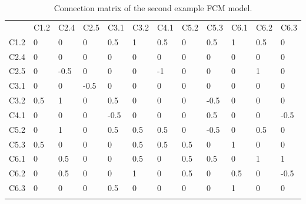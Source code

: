 \documentclass[graybox]{svmult}
\begin{document}
\begin{table}
\caption{Connection matrix of the second example FCM model.}
\label{tab:BP2Spartial-connectionMtx}
\begin{center}
\begin{tabular}{l|lllllllllll}
\hline\noalign{\smallskip}
 & C1.2 & C2.4 & C2.5 & C3.1 & C3.2 & C4.1 & C5.2 & C5.3 & C6.1 & C6.2 & C6.3\\
\noalign{\smallskip}\hline\noalign{\smallskip}
C1.2 & 0 & 0 & 0 & 0.5 & 1 & 0.5 & 0 & 0.5 & 1 & 0.5 & 0\\
C2.4 & 0 & 0 & 0 & 0 & 0 & 0 & 0 & 0 & 0 & 0 & 0\\
C2.5 & 0 & -0.5 & 0 & 0 & 0 & -1 & 0 & 0 & 0 & 1 & 0\\
C3.1 & 0 & 0 & -0.5 & 0 & 0 & 0 & 0 & 0 & 0 & 0 & 0\\
C3.2 & 0.5 & 1 & 0 & 0.5 & 0 & 0 & 0 & -0.5 & 0 & 0 & 0\\
C4.1 & 0 & 0 & 0 & -0.5 & 0 & 0 & 0 & 0.5 & 0 & 0 & -0.5\\
C5.2 & 0 & 1 & 0 & 0.5 & 0.5 & 0.5 & 0 & -0.5 & 0 & 0.5 & 0\\
C5.3 & 0.5 & 0 & 0 & 0 & 0.5 & 0.5 & 0.5 & 0 & 1 & 0 & 0\\
C6.1 & 0 & 0.5 & 0 & 0 & 0.5 & 0 & 0.5 & 0.5 & 0 & 1 & 1\\
C6.2 & 0 & 0.5 & 0 & 0 & 1 & 0 & 0.5 & 0 & 0.5 & 0 & -0.5\\
C6.3 & 0 & 0 & 0 & 0.5 & 0 & 0 & 0 & 0 & 1 & 0 & 0\\
\noalign{\smallskip}\hline
\end{tabular}
\end{center}
\end{table}
\end{document}
